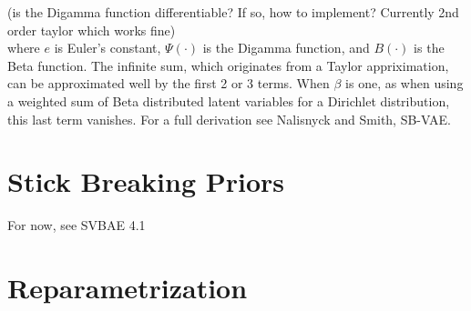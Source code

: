 \documentclass{article}
\begin{document}
(is the Digamma function differentiable? If so, how to implement? Currently 2nd order taylor which works fine)\\

where $e$ is Euler’s constant, $\Psi(\cdot)$ is the Digamma function, and $B(\cdot)$ is the Beta function.
The infinite sum, which originates from a Taylor appriximation, can be approximated well by the first 2 or 3 terms. When $\beta$ is one, as when using a weighted sum of Beta distributed latent variables for a Dirichlet distribution, this last term vanishes. For a full derivation see Nalisnyck and Smith, SB-VAE.

\section{Stick Breaking Priors}

For now, see SVBAE 4.1

\section{Reparametrization}
\end{document}
